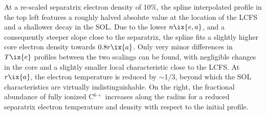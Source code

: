                 At a re-scaled separatrix electron density of 10\%, the spline interpolated profile in the top left features a roughly halved absolute value at the location of the LCFS and a shallower decay in the SOL. Due to the lower $n\ix{e,a}$, and a consequently steeper slope close to the separatrix, the spline fits a slightly higher core electron density towards $0.8r\ix{a}$. Only very minor differences in $T\ix{e}$ profiles between the two scalings can be found, with negligible changes in the core and a slightly smaller local characteristic close to the LCFS. At $r\ix{a}$, the electron temperature is reduced by $\sim$1/3, beyond which the SOL characteristics are virtually indistinguishable. On the right, the fractional abundance of fully ionized C$^{6+}$ increases along the radius for a reduced separatrix electron temperature and density with respect to the initial profile.\\%
%
                \begin{figure}[t]%
                    \centering%
                    \begin{minipage}[b]{0.48\textwidth}%
                        \centering%
                    \end{minipage}%
                    \hfill%
                    \begin{minipage}[b]{0.48\textwidth}%
                        \centering%
                    \end{minipage}%
                    \label{fig:rad_ratios_total_82_90}%
                \end{figure}%
